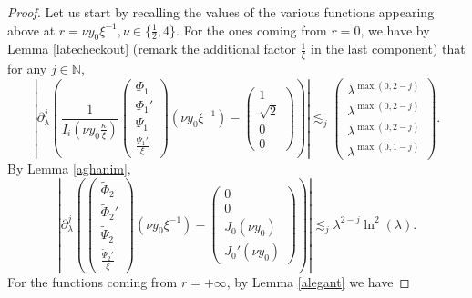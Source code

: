 \documentclass[11 pt]{amsart}
\theoremstyle{definition}
\theoremstyle{remark}
\numberwithin{equation}{section}
\begin{document}
\begin{proof}
  Let us start by recalling the values of the various functions appearing above at $r = \nu y_0 \xi^{- 1}, \nu \in \{
  \frac 12, 4 \}$. For the ones coming from $r = 0$, we have by Lemma
  \ref{latecheckout} (remark the additional factor $\frac{1}{\xi}$ in the last
  component) that for any $j \in \mathbb{N}$,
    \begin{equation} \label{somebodyscream-10}  \left| \partial_{\lambda}^j \left( \frac{1}{I_i \left( \nu y_0
     \frac{\kappa}{\xi} \right)} \left(\begin{array}{c}
       \Phi_1\\
       \Phi_1'\\
       \Psi_1\\
       \frac{\Psi_1'}{\xi}
     \end{array}\right) (\nu y_0 \xi^{- 1}) - \left(\begin{array}{c}
       1\\
       \sqrt{2}\\
       0\\
       0
     \end{array}\right) \right) \right| \lesssim_j \left(\begin{array}{c}
       \lambda^{\max (0, 2 - j)}\\
       \lambda^{\max (0, 2 - j)}\\
       \lambda^{\max (0, 2 - j)}\\
       \lambda^{\max (0, 1 - j)}
     \end{array}\right) . 
     \end{equation}
  By Lemma \ref{aghanim},
  \begin{equation}
    \left| \partial_{\lambda}^j \left( \left(\begin{array}{c}
      \widetilde{\Phi}_2\\
      \widetilde{\Phi}_2'\\
      \widetilde{\Psi}_2\\
      \frac{\widetilde{\Psi}_2'}{\xi}
    \end{array}\right) (\nu y_0 \xi^{- 1}) - \left(\begin{array}{c}
      0\\
      0\\
      J_0 (\nu y_0)\\
      J_0' (\nu y_0)
    \end{array}\right) \right) \right| \lesssim_j \lambda^{2 - j} \ln^2
    (\lambda) . \label{somebodyscream}
  \end{equation}
  For the functions coming from $r = + \infty$, by Lemma \ref{alegant} we have

\end{proof}
\end{document}
